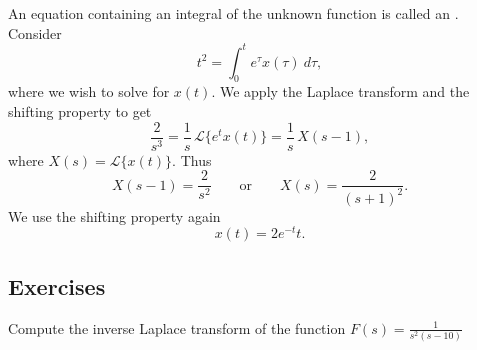 \begin{example}
An equation containing an integral of the unknown function is
called an \emph{}.
Consider
\begin{equation*}
t^2 = \int_0^t e^{\tau} x(\tau) ~d\tau ,
\end{equation*}
where we wish to solve for $x(t)$.
We apply the Laplace transform and the shifting property to get
\begin{equation*}
\frac{2}{s^3} = \frac{1}{s} \, \mathcal{L} \bigl\{ e^{t} x(t) \bigr\}
=
\frac{1}{s} \, X(s-1) ,
\end{equation*}
where $X(s) = \mathcal{L} \bigl\{ x(t) \bigr\}$.  Thus
\begin{equation*}
X(s-1) =
\frac{2}{s^2} \qquad \text{or} \qquad
X(s) =
\frac{2}{{(s+1)}^2}.
\end{equation*}
We use the shifting property again
\begin{equation*}
x(t) = 2 e^{-t} t .
\end{equation*}
\end{example}

\subsection{Exercises}

\begin{exercise}
	Compute the inverse Laplace transform of the function $F(s)=\frac{1}{s^{2}\left(s-10\right)}$
\end{exercise}

